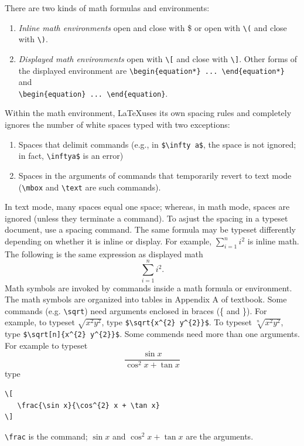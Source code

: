 There are two kinds of math formulas and environments:
\begin{enumerate}
   \item \emph{Inline math environments} open and close with \$ or open with \verb+\(+ and close with \verb+\)+.
   \item \emph{Displayed math environments} open with \verb+\[+ and close with \verb+\]+.  Other forms of the displayed
         environment are \verb+\begin{equation*} ... \end{equation*}+ and\\
          \verb+\begin{equation} ... \end{equation}+.
\end{enumerate}
Within the math environment, \LaTeX uses its own spacing rules and completely ignores the number of white spaces typed with two exceptions:
\begin{enumerate}
  \item Spaces that delimit commands (e.g., in \verb+$\infty a$+, the space is not ignored; in fact, \verb+\inftya$+ is
        an error)
  \item Spaces in the arguments of commands that temporarily revert to text mode (\verb+\mbox+ and \verb+\text+ are such commands).
\end{enumerate}
In text mode, many spaces equal one space; whereas, in math mode, spaces are ignored (unless they terminate a command). To asjust the spacing in a typeset document, use a spacing command. The same formula may be typeset differently depending on whether it is inline or display. For example, $\sum_{i=1}^{n} i^{2}$ is inline math.  The following is the same expression as displayed math
\[
  \sum_{i=1}^{n} i^{2}.
\]
Math symbols are invoked by commands inside a math formula or environment. The math symbols are organized into tables in Appendix A of textbook. Some commands (e.g. \verb+\sqrt+) need arguments enclosed in braces (\{ and \}).  For example, to typeset $\sqrt{x^{2} y^{2}}$, type \verb+$\sqrt{x^{2} y^{2}}$+. To typeset $\sqrt[n]{x^{2} y^{2}}$, type \verb+$\sqrt[n]{x^{2} y^{2}}$+. Some commends need more than one arguments.  For example to typeset
\[
   \frac{\sin x}{\cos^{2} x + \tan x}
\]
type
\begin{verbatim}
\[
   \frac{\sin x}{\cos^{2} x + \tan x}
\]
\end{verbatim}
\verb+\frac+ is the command; $\sin x$ and $\cos^{2} x + \tan x$ are the arguments.\\

